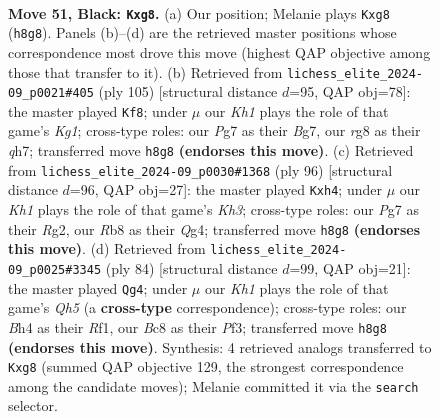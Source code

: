 \documentclass[11pt]{article}
\begin{document}
\begin{figure}[p]\centering
\begin{subfigure}{0.46\textwidth}\centering
\resizebox{\linewidth}{!}{%
\newchessgame
\chessboard[
  setfen={qrb3Rk/p1p2pp1/1p6/7p/1P3P1b/B3Q2P/P1B3P1/7K b - - 0 51},
  showmover=false,
  pgfstyle=straightmove, color=movearrow, markmove={h8-g8}
]}
\caption{}
\end{subfigure}\hfill
\begin{subfigure}{0.46\textwidth}\centering
\resizebox{\linewidth}{!}{%
\newchessgame
\chessboard[
  setfen={6k1/1qr2pbQ/1p2p2p/4P1pP/3P4/2p1P3/R1B2P2/6K1 b - - 13 53},
  showmover=false,
  pgfstyle=straightmove, color=movearrow, markmove={g8-f8}
]}
\caption{}
\end{subfigure}
\\[4pt]
\begin{subfigure}{0.46\textwidth}\centering
\resizebox{\linewidth}{!}{%
\newchessgame
\chessboard[
  setfen={8/kpb5/2pq2B1/p7/P2P2Qp/2P1r2K/1P4R1/8 w - - 1 49},
  showmover=false,
  pgfstyle=straightmove, color=movearrow, markmove={h3-h4}
]}
\caption{}
\end{subfigure}\hfill
\begin{subfigure}{0.46\textwidth}\centering
\resizebox{\linewidth}{!}{%
\newchessgame
\chessboard[
  setfen={5k2/3p1p2/1B3q1p/P1p2r1Q/1p1b3P/1P3PK1/2P5/5R2 w - - 3 43},
  showmover=false,
  pgfstyle=straightmove, color=movearrow, markmove={h5-g4}
]}
\caption{}
\end{subfigure}
\caption{\textbf{Move 51, Black: \texttt{Kxg8}.} (a) Our position; Melanie plays \texttt{Kxg8} (\texttt{h8g8}). Panels (b)--(d) are the retrieved master positions whose correspondence most drove this move (highest QAP objective among those that transfer to it). (b) Retrieved from \texttt{lichess\_elite\_2024-09\_p0021\#405} (ply 105) [structural distance $d$=95, QAP obj=78]: the master played \texttt{Kf8}; under $\mu$ our \emph{Kh1} plays the role of that game's \emph{Kg1}; cross-type roles: our \emph{P}g7 as their \emph{B}g7, our \emph{r}g8 as their \emph{q}h7; transferred move \texttt{h8g8} \textbf{(endorses this move)}. (c) Retrieved from \texttt{lichess\_elite\_2024-09\_p0030\#1368} (ply 96) [structural distance $d$=96, QAP obj=27]: the master played \texttt{Kxh4}; under $\mu$ our \emph{Kh1} plays the role of that game's \emph{Kh3}; cross-type roles: our \emph{P}g7 as their \emph{R}g2, our \emph{R}b8 as their \emph{Q}g4; transferred move \texttt{h8g8} \textbf{(endorses this move)}. (d) Retrieved from \texttt{lichess\_elite\_2024-09\_p0025\#3345} (ply 84) [structural distance $d$=99, QAP obj=21]: the master played \texttt{Qg4}; under $\mu$ our \emph{Kh1} plays the role of that game's \emph{Qh5} (a \textbf{cross-type} correspondence); cross-type roles: our \emph{B}h4 as their \emph{R}f1, our \emph{B}c8 as their \emph{P}f3; transferred move \texttt{h8g8} \textbf{(endorses this move)}. Synthesis: 4 retrieved analogs transferred to \texttt{Kxg8} (summed QAP objective 129, the strongest correspondence among the candidate moves); Melanie committed it via the \texttt{search} selector.}
\label{fig:thought-m101}
\end{figure}
\end{document}
